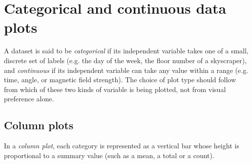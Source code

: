 \section{Categorical and continuous data plots}
	A dataset is said to be \emph{categorical} if its independent variable takes one of a small, discrete set of labels (e.g. the day of the week, the floor number of a skyscraper), and \emph{continuous} if its independent variable can take any value within a range (e.g. time, angle, or magnetic field strength). The choice of plot type should follow from which of these two kinds of variable is being plotted, not from visual preference alone.
	
	\subsection{Column plots}
		In a \emph{column plot}, each category is represented as a vertical bar whose height is proportional to a summary value (such as a mean, a total or a count). %
		
